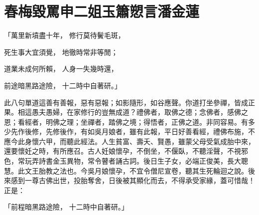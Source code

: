 %

\chapter{春梅毀罵申二姐\KG 玉簫愬言潘金蓮}


\begin{showcontents}{}




「萬里新墳盡十年，  修行莫待鬢毛斑，

死生事大宜須覺，  地徹時常非等閒；

道業未成何所賴，  人身一失幾時還，

前途暗黑路途險，  十二時中自著研。」

此八句單道這善有善報，惡有惡報；如影隨形，如谷應聲。你道打坐參禪，皆成正果。相這愚夫愚婦，在家修行的豈無成道？禮佛者，取佛之德；念佛者，感佛之恩；看經者，明佛之理；坐禪者，踏佛之境；得悟者，正佛之道。非同容易。有多少先作後修，先修後作，有如吳月娘者，雖有此報，平日好善看經，禮佛布施，不應今此身懷六甲，而聽此經法。人生貧富、壽夭、賢愚，雖蒙父母受氣成胎中來，還要懷妊之時，有所應召。古人妊娘懷孕，不倒坐，不偃臥，不聽淫聲，不視邪色，常玩弄詩書金玉異物，常令瞽者誦古詞。後日生子女，必端正俊美，長大聰慧。此文王胎教之法也。今吳月娘懷孕，不宜令僧尼宣卷，聽其生死輪迴之說。後來感到一尊古佛出世，投胎奪舍，日後被其顯化而去，不得承受家緣，蓋可惜哉！正是：

「前程暗黑路途險，  十二時中自著研。」


\end{showcontents}
